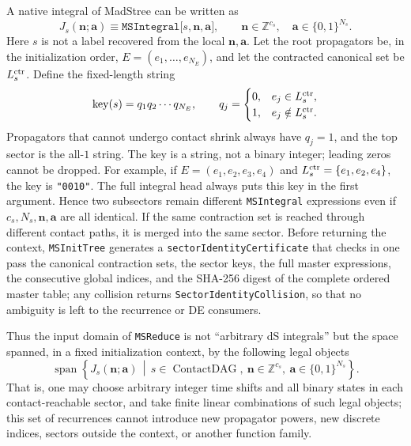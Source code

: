 \documentclass[11pt,a4paper]{article}
\begin{document}
A native integral of MadStree can be written as
\begin{equation}
 J_s(\bm n;\bm a)
 \equiv\texttt{MSIntegral[}s,\bm n,\bm a\texttt{]},
 \qquad
 \bm n\in\mathbb Z^{c_s},
 \quad
 \bm a\in\{0,1\}^{N_s}.
 \label{eq:MSIntegral-domain}
\end{equation}
Here $s$ is not a label recovered from the local $\bm n,\bm a$. Let the root propagators be, in the initialization order,
$E=(e_1,\ldots,e_{N_E})$, and let the contracted canonical set be $L_s^{\rm ctr}$. Define the fixed-length string
\begin{equation}
 \operatorname{key}(s)=q_1q_2\cdots q_{N_E},\qquad
 q_j=\begin{cases}0,&e_j\in L_s^{\rm ctr},\\1,&e_j\notin L_s^{\rm ctr}.
 \end{cases}
 \label{eq:sector-bit-string-key}
\end{equation}
Propagators that cannot undergo contact shrink always have $q_j=1$, and the top sector is the all-$1$ string. The key is a string, not a binary integer; leading zeros cannot be dropped. For example, if $E=(e_1,e_2,e_3,e_4)$ and $L_s^{\rm ctr}=\{e_1,e_2,e_4\}$, the key is \texttt{"0010"}. The full integral head always puts this key in the first argument. Hence two subsectors remain different \texttt{MSIntegral} expressions even if $c_s,N_s,\bm n,\bm a$ are all identical. If the same contraction set is reached through different contact paths, it is merged into the same sector. Before returning the context, \texttt{MSInitTree} generates a \texttt{sectorIdentityCertificate} that checks in one pass the canonical contraction sets, the sector keys, the full master expressions, the consecutive global indices, and the SHA-256 digest of the complete ordered master table; any collision returns \texttt{SectorIdentityCollision}, so that no ambiguity is left to the recurrence or DE consumers.

Thus the input domain of \texttt{MSReduce} is not ``arbitrary dS integrals'' but the space spanned, in a fixed initialization context, by the following legal objects
\begin{equation}
 \boxed{
 \operatorname{span}\!\left\{
 J_s(\bm n;\bm a)\,\middle|\,
 s\in\operatorname{ContactDAG},\
 \bm n\in\mathbb Z^{c_s},\
 \bm a\in\{0,1\}^{N_s}
 \right\}.
 }
 \label{eq:MSReduce-domain}
\end{equation}
That is, one may choose arbitrary integer time shifts and all binary states in each contact-reachable sector, and take finite linear combinations of such legal objects; this set of recurrences cannot introduce new propagator powers, new discrete indices, sectors outside the context, or another function family.
\end{document}
